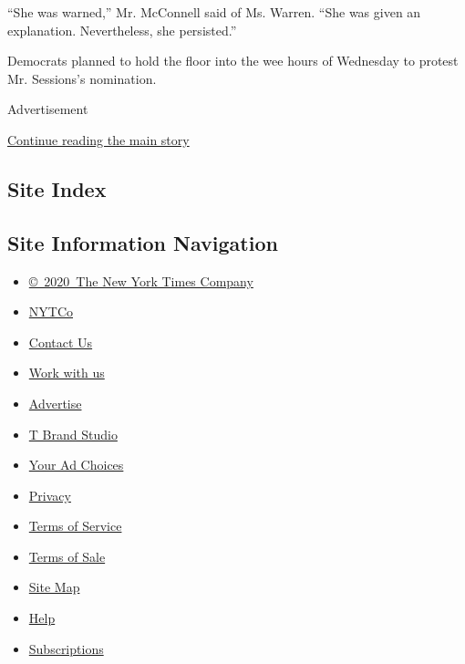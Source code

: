 ``She was warned,'' Mr. McConnell said of Ms. Warren. ``She was given an
explanation. Nevertheless, she persisted.''

Democrats planned to hold the floor into the wee hours of Wednesday to
protest Mr. Sessions's nomination.

Advertisement

\protect\hyperlink{after-bottom}{Continue reading the main story}

\hypertarget{site-index}{%
\subsection{Site Index}\label{site-index}}

\hypertarget{site-information-navigation}{%
\subsection{Site Information
Navigation}\label{site-information-navigation}}

\begin{itemize}
\tightlist
\item
  \href{https://help.nytimes.com/hc/en-us/articles/115014792127-Copyright-notice}{©~2020~The
  New York Times Company}
\end{itemize}

\begin{itemize}
\tightlist
\item
  \href{https://www.nytco.com/}{NYTCo}
\item
  \href{https://help.nytimes.com/hc/en-us/articles/115015385887-Contact-Us}{Contact
  Us}
\item
  \href{https://www.nytco.com/careers/}{Work with us}
\item
  \href{https://nytmediakit.com/}{Advertise}
\item
  \href{http://www.tbrandstudio.com/}{T Brand Studio}
\item
  \href{https://www.nytimes.com/privacy/cookie-policy\#how-do-i-manage-trackers}{Your
  Ad Choices}
\item
  \href{https://www.nytimes.com/privacy}{Privacy}
\item
  \href{https://help.nytimes.com/hc/en-us/articles/115014893428-Terms-of-service}{Terms
  of Service}
\item
  \href{https://help.nytimes.com/hc/en-us/articles/115014893968-Terms-of-sale}{Terms
  of Sale}
\item
  \href{https://spiderbites.nytimes.com}{Site Map}
\item
  \href{https://help.nytimes.com/hc/en-us}{Help}
\item
  \href{https://www.nytimes.com/subscription?campaignId=37WXW}{Subscriptions}
\end{itemize}
